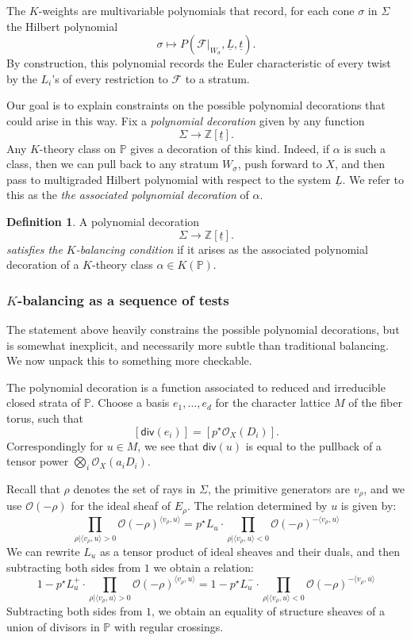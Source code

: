 \documentclass[11pt]{amsart}
\theoremstyle{definition}
\theoremstyle{definition}
\newtheorem{definition}[theorem]{Definition}
\begin{document}
The $K$-weights are multivariable polynomials that record, for each cone $\sigma$ in $\Sigma$ the Hilbert polynomial
\[
\sigma\mapsto P(\mathcal F|_{W_\sigma},\underline L,\underline t).
\]
By construction, this polynomial records the Euler characteristic of every twist by the $L_i$'s of every restriction to $\mathcal F$ to a stratum. 

Our goal is to explain constraints on the possible polynomial decorations that could arise in this way. Fix a {\it polynomial decoration} given by any function
\[
\Sigma\to \mathbb Z[\underline t].
\]
Any $K$-theory class on $\mathbb P$ gives a decoration of this kind. Indeed, if $\alpha$ is such a class, then we can pull back to any stratum $W_\sigma$, push forward to $X$, and then pass to multigraded Hilbert polynomial with respect to the system $\underline L$. We refer to this as the {\it the associated polynomial decoration} of $\alpha$. 

\begin{definition}
A polynomial decoration
\[
\Sigma\to \mathbb Z[\underline t].
\]
{\it satisfies the $K$-balancing condition} if it arises as the associated polynomial decoration of a $K$-theory class $\alpha\in K(\mathbb P)$. 
\end{definition}

\subsubsection{$K$-balancing as a sequence of tests} The statement above heavily constrains the possible polynomial decorations, but is somewhat inexplicit, and necessarily more subtle than traditional balancing. We now unpack this to something more checkable. 

The polynomial decoration is a function associated to reduced and irreducible closed strata of $\mathbb P$. Choose a basis $e_1,\ldots,e_d$ for the character lattice $M$ of the fiber torus, such that
\[
[\mathsf{div}(e_i)] = [p^\star \mathcal O_X(D_i)]. 
\]
Correspondingly for $u\in M$, we see that $\mathsf{div}(u)$ is equal to the pullback of a tensor power $\bigotimes_i \mathcal O_X(a_iD_i)$. 

Recall that $\rho$ denotes the set of rays in $\Sigma$, the primitive generators are $v_\rho$, and we use $\mathcal O(-\rho)$ for the ideal sheaf of $E_\rho$. The relation determined by $u$ is given by:
\[
\prod_{\rho|\langle v_\rho,u\rangle >0} \mathcal O(-\rho)^{\langle v_\rho,u\rangle} = p^\star L_u\cdot \prod_{\rho|\langle v_\rho,u\rangle <0} \mathcal O(-\rho)^{-\langle v_\rho,u\rangle}
\]
We can rewrite $L_u$ as a tensor product of ideal sheaves and their duals, and then subtracting both sides from $1$ we obtain a relation:
\[
1-p^\star L_u^{+}\cdot \prod_{\rho|\langle v_\rho,u\rangle >0} \mathcal O(-\rho)^{\langle v_\rho,u\rangle} = 1-p^\star L^{-}_u\cdot \prod_{\rho|\langle v_\rho,u\rangle <0} \mathcal O(-\rho)^{-\langle v_\rho,u\rangle}
\]
Subtracting both sides from $1$, we obtain an equality of structure sheaves of a union of divisors in $\mathbb P$ with regular crossings. 
\end{document}
